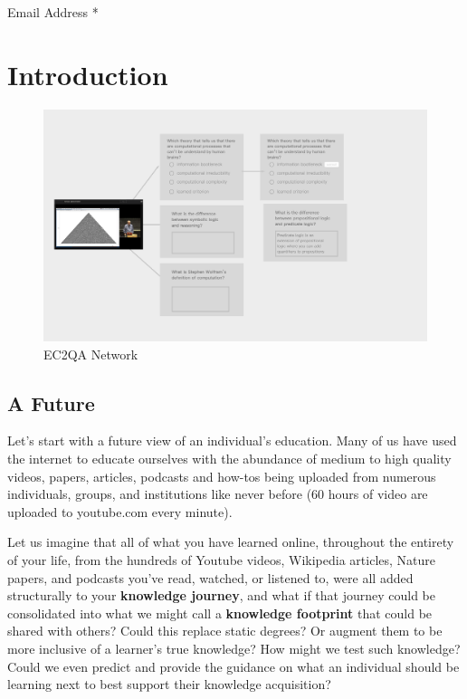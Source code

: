 \documentclass[]{book}
\theoremstyle{definition}
\theoremstyle{definition}
\theoremstyle{definition}
\theoremstyle{remark}
\begin{document}
Email Address *

\hypertarget{mce-responses}{}
\hypertarget{mce-error-response}{}

\hypertarget{mce-success-response}{}

\chapter{Introduction}\label{introduction}

\begin{figure}
\centering
\includegraphics{img/MtoQA.png}
\caption{EC2QA Network}
\end{figure}

\section{A Future}\label{a-future}

Let's start with a future view of an individual's education. Many of us
have used the internet to educate ourselves with the abundance of medium
to high quality videos, papers, articles, podcasts and how-tos being
uploaded from numerous individuals, groups, and institutions like never
before (60 hours of video are uploaded to youtube.com every minute).

Let us imagine that all of what you have learned online, throughout the
entirety of your life, from the hundreds of Youtube videos, Wikipedia
articles, Nature papers, and podcasts you've read, watched, or listened
to, were all added structurally to your \textbf{knowledge journey}, and
what if that journey could be consolidated into what we might call a
\textbf{knowledge footprint} that could be shared with others? Could
this replace static degrees? Or augment them to be more inclusive of a
learner's true knowledge? How might we test such knowledge? Could we
even predict and provide the guidance on what an individual should be
learning next to best support their knowledge acquisition?
\end{document}

